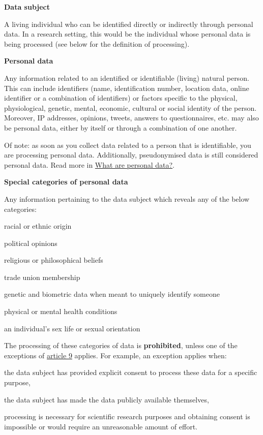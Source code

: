 \documentclass[
]{book}
\begin{document}
\textbf{Data subject}

A living individual who can be identified directly or indirectly through personal data. In a research setting, this would be the individual whose personal data is being processed (see below for the definition of processing).

\textbf{Personal data}

Any information related to an identified or identifiable (living) natural person. This can include identifiers (name, identification number, location data, online identifier or a combination of identifiers) or factors specific to the physical, physiological, genetic, mental, economic, cultural or social identity of the person. Moreover, IP addresses, opinions, tweets, answers to questionnaires, etc. may also be personal data, either by itself or through a combination of one another.

Of note: as soon as you collect data related to a person that is identifiable, you are processing personal data. Additionally, pseudonymised data is still considered personal data. Read more in \protect\hyperlink{personal-data}{What are personal data?}.

\textbf{Special categories of personal data}

Any information pertaining to the data subject which reveals any of the below categories:

racial or ethnic origin

political opinions

religious or philosophical beliefs

trade union membership

genetic and biometric data when meant to uniquely identify someone

physical or mental health conditions

an individual's sex life or sexual orientation

The processing of these categories of data is \textbf{prohibited}, unless one of the exceptions of \href{https://gdpr-info.eu/art-9-gdpr/}{article 9} applies. For example, an exception applies when:

the data subject has provided explicit consent to process these data for a specific purpose,

the data subject has made the data publicly available themselves,

processing is necessary for scientific research purposes and obtaining consent is impossible or would require an unreasonable amount of effort.
\end{document}
